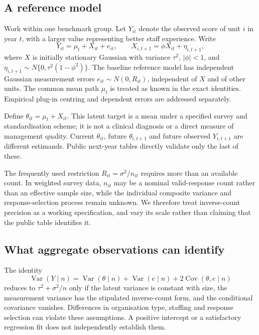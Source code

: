 \documentclass[11pt,letterpaper]{article}
\newcommand{\Var}{\operatorname{Var}}
\newcommand{\Cov}{\operatorname{Cov}}
\begin{document}
\subsection{A reference model}
Work within one benchmark group. Let $Y_{it}$ denote the observed score of unit $i$ in year $t$, with a larger value representing better staff experience. Write
\begin{equation}
 Y_{it}=\mu_t+X_{it}+e_{it},\qquad
 X_{i,t+1}=\phi X_{it}+\eta_{i,t+1},
 \label{eq:model}
\end{equation}
where $X$ is initially stationary Gaussian with variance $\tau^2$, $|\phi|<1$, and $\eta_{i,t+1}\sim N\{0,\tau^2(1-\phi^2)\}$. The baseline reference model has independent Gaussian measurement errors $e_{it}\sim N(0,R_{it})$, independent of $X$ and of other units. The common mean path $\mu_t$ is treated as known in the exact identities. Empirical plug-in centring and dependent errors are addressed separately.

Define $\theta_{it}=\mu_t+X_{it}$. This latent target is a mean under a specified survey and standardisation scheme; it is not a clinical diagnosis or a direct measure of management quality. Current $\theta_{it}$, future $\theta_{i,t+1}$ and future observed $Y_{i,t+1}$ are different estimands. Public next-year tables directly validate only the last of these.

The frequently used restriction $R_{it}=\sigma^2/n_{it}$ requires more than an available count. In weighted survey data, $n_{it}$ may be a nominal valid-response count rather than an effective sample size, while the individual composite variance and response-selection process remain unknown. We therefore treat inverse-count precision as a working specification, and vary its scale rather than claiming that the public table identifies it.

\subsection{What aggregate observations can identify}
The identity
\begin{equation}
 \Var(Y\mid n)=\Var(\theta\mid n)+\Var(e\mid n)
                  +2\Cov(\theta,e\mid n)
 \label{eq:variance_size}
\end{equation}
reduces to $\tau^2+\sigma^2/n$ only if the latent variance is constant with size, the measurement variance has the stipulated inverse-count form, and the conditional covariance vanishes. Differences in organisation type, staffing and response selection can violate these assumptions. A positive intercept or a satisfactory regression fit does not independently establish them.
\end{document}
